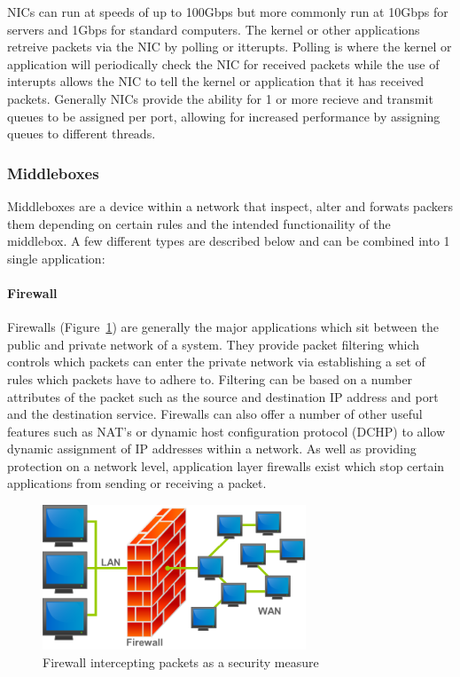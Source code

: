 \documentclass[final_report.tex]{subfiles}
\begin{document}
NICs can run at speeds of up to 100Gbps but more commonly run at 10Gbps for servers and 1Gbps for standard computers. The kernel or other applications retreive packets via the NIC by polling or itterupts. Polling is where the kernel or application will periodically check the NIC for received packets while the use of interupts allows the NIC to tell the kernel or application that it has received packets. Generally NICs provide the ability for 1 or more recieve and transmit queues to be assigned per port, allowing for increased performance by assigning queues to different threads.

\subsubsection{Middleboxes}
Middleboxes are a device within a network that inspect, alter and forwats packers them depending on certain rules and the intended functionaility of the middlebox. A few different types are described below and can be combined into 1 single application:

\paragraph*{Firewall}
Firewalls (Figure~\ref{fig:firewall}) are generally the major applications which sit between the public and private network of a system. They provide packet filtering which controls which packets can enter the private network via establishing a set of rules which packets have to adhere to. Filtering can be based on a number attributes of the packet such as the source and destination IP address and port and the destination service. Firewalls can also offer a number of other useful features such as NAT's or dynamic host configuration protocol (DCHP) to allow dynamic assignment of IP addresses within a network. As well as providing protection on a network level, application layer firewalls exist which stop certain applications from sending or receiving a packet.

\begin{figure}[H]
	\centering
	\includegraphics[width=0.7\textwidth]{img/firewall.png}
	\caption{Firewall intercepting packets as a security measure \cite{firewall}}
	\label{fig:firewall}
\end{figure}
\end{document}
